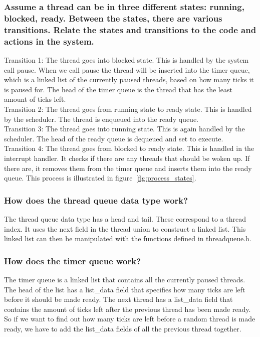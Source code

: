 \subsubsection*{Assume a thread can be in three different states: running, blocked, ready. Between the states, there are various transitions. Relate the states and transitions to the code and actions in the system.}
Transition 1: The thread goes into blocked state. This is handled by the system call pause. When we call pause the thread will be inserted into the timer queue, which is a linked list of the currently paused threads, based on how many ticks it is paused for.  The head of the timer queue is the thread that has the least amount of ticks left.\\
Transition 2: The thread goes from running state to ready state. This is handled by the scheduler. The thread is enqueued into the ready queue.\\
Transition 3: The thread goes into running state. This is again handled by the scheduler. The head of the ready queue is dequeued and set to execute.\\
Transition 4: The thread goes from blocked to ready state. This is handled in the interrupt handler. It checks if there are any threads that should be woken up. If there are, it removes them from the timer queue and inserts them into the ready queue. This process is illustrated in  figure~\ref{fig:process_states}.

\subsubsection*{How does the thread queue data type work?}
The thread queue data type has a head and tail. These correspond to a thread index. It uses the next field in the thread union to construct a linked list. This linked list can then be manipulated with the functions defined in threadqueue.h.\\
\subsubsection*{How does the timer queue work?}
The timer queue is a linked list that contains all the currently paused threads. The head of the list has a list\_{}data field that specifies how many ticks are left before it should be made ready. The next thread has a list\_{}data field that contains the amount of ticks left after the previous thread has been made ready. So if we want to find out how many ticks are left before a random thread is made ready, we have to add the list\_{}data fields of all the previous thread together.\\


